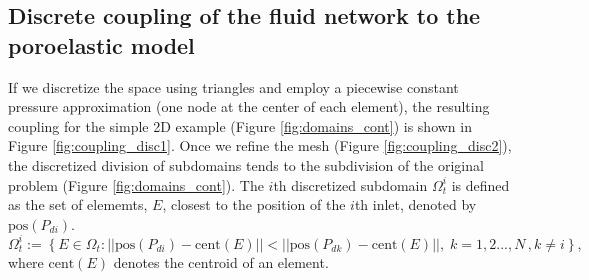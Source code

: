 \subsection{Discrete coupling of the fluid network to the poroelastic model}
\label{sec:coupling_appendix}
If we discretize the space using triangles and employ a piecewise constant pressure approximation (one node at the center of each element), the resulting coupling for the simple 2D example (Figure \ref{fig:domains_cont}) is shown in Figure \ref{fig:coupling_disc1}. Once we refine the mesh (Figure \ref{fig:coupling_disc2}), the discretized division of subdomains tends to the subdivision of the original problem (Figure \ref{fig:domains_cont}).
%
The $i$th discretized subdomain $\Omega_{t}^{i}$ is defined as the set of elememts, $E$, closest to the position of the $i$th inlet, denoted by $\mbox{pos}(P_{di})$. 
\begin{equation}
\Omega_{t}^{i} := \left\lbrace E \in \Omega_{t} : ||\mbox{pos}(P_{di}) - \mbox{cent}(E) || <  ||\mbox{pos}(P_{dk}) - \mbox{cent}(E) ||, \;k=1,2...,N \,, k \neq i \right\rbrace,
 \label{discrete_subdomain_definition}
\end{equation} 
where $ \mbox{cent}(E)$ denotes the centroid of an element.
